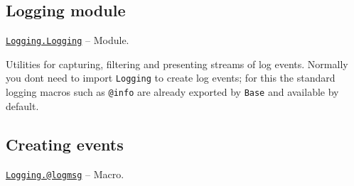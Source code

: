 \hypertarget{9952495786425959332}{}


\subsection{Logging module}


\hypertarget{1488091939099076420}{} 
\hyperlink{1488091939099076420}{\texttt{Logging.Logging}}  -- {Module.}

\begin{adjustwidth}{2em}{0pt}

Utilities for capturing, filtering and presenting streams of log events. Normally you don{\textquotesingle}t need to import \texttt{Logging} to create log events; for this the standard logging macros such as \texttt{@info} are already exported by \texttt{Base} and available by default.



\end{adjustwidth}

\hypertarget{16245113775601037343}{}


\subsection{Creating events}


\hypertarget{2787319849348710857}{} 
\hyperlink{2787319849348710857}{\texttt{Logging.@logmsg}}  -- {Macro.}

